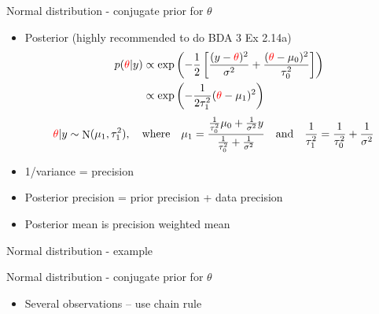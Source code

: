 \documentclass[english,t]{beamer}
\DeclareMathOperator{\N}{N}
\begin{document}
\begin{frame}{Normal distribution - conjugate prior for $\theta$}

  \begin{itemize}
  \item Posterior (highly recommended to do BDA 3 Ex 2.14a)
    \vskip -5mm
    \begin{align*}
      & &
          p({\color{red}\theta}|y)&\propto \exp\left(-\frac{1}{2}\left[
                                    \frac{(y-{\color{red}\theta})^2}{\sigma^2}+\frac{({\color{red}\theta}-\mu_0)^2}{\tau_0^2} \right]\right) \\ 
      & & & \propto \exp \left(-\frac{1}{2\tau_1^2}({\color{red}\theta}-\mu_1)^2
            \right)
    \end{align*}
    \begin{equation*}
      {\color{red}\theta}|y \sim \N(\mu_1,\tau_1^2), \quad
      \text{where} \quad
      \mu_1=\frac{\frac{1}{\tau_0^2}\mu_0+\frac{1}{\sigma^2}y}{\frac{1}{\tau_0^2}+\frac{1}{\sigma^2}} \quad  \text{and}  \quad \frac{1}{\tau_1^2} = \frac{1}{\tau_0^2}+\frac{1}{\sigma^2}
    \end{equation*}
    \vskip -2mm
    \pause
  \item 1/variance = precision
  \item Posterior precision = prior precision + data precision
  \item Posterior mean is precision weighted mean
  \end{itemize}


\end{frame}

\begin{frame}{Normal distribution - example}

  
\end{frame}

\begin{frame}{Normal distribution - conjugate prior for $\theta$}

  \begin{itemize}
  \item Several observations -- use chain rule
  \end{itemize}

\end{frame}
\end{document}
